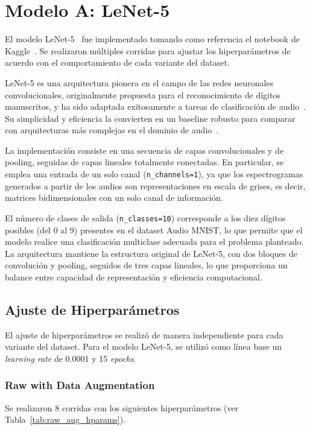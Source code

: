 \documentclass[conference]{IEEEtran}
\begin{document}
\section{Modelo A: LeNet-5}

El modelo LeNet-5~\cite{lenet5_original} fue implementado tomando como referencia el notebook de Kaggle~\cite{lenet5_kaggle}. Se realizaron múltiples corridas para ajustar los hiperparámetros de acuerdo con el comportamiento de cada variante del dataset.

LeNet-5 es una arquitectura pionera en el campo de las redes neuronales convolucionales, originalmente propuesta para el reconocimiento de dígitos manuscritos, y ha sido adaptada exitosamente a tareas de clasificación de audio~\cite{audio_mnist_cnn}. Su simplicidad y eficiencia la convierten en un baseline robusto para comparar con arquitecturas más complejas en el dominio de audio~\cite{audio_cnn_review}.

La implementación consiste en una secuencia de capas convolucionales y de pooling, seguidas de capas lineales totalmente conectadas. En particular, se emplea una entrada de un solo canal (\texttt{n\_channels=1}), ya que los espectrogramas generados a partir de los audios son representaciones en escala de grises, es decir, matrices bidimensionales con un solo canal de información. 

El número de clases de salida (\texttt{n\_classes=10}) corresponde a los diez dígitos posibles (del 0 al 9) presentes en el dataset Audio MNIST, lo que permite que el modelo realice una clasificación multiclase adecuada para el problema planteado. La arquitectura mantiene la estructura original de LeNet-5, con dos bloques de convolución y pooling, seguidos de tres capas lineales, lo que proporciona un balance entre capacidad de representación y eficiencia computacional.

\subsection{Ajuste de Hiperparámetros}
El ajuste de hiperparámetros se realizó de manera independiente para cada variante del dataset. Para el modelo LeNet-5, se utilizó como línea base un \textit{learning rate} de 0.0001 y 15 \textit{epochs}.

\subsubsection{Raw with Data Augmentation}
Se realizaron 8 corridas con los siguientes hiperparámetros (ver Tabla~\ref{tab:raw_aug_hparams}).
\end{document}
